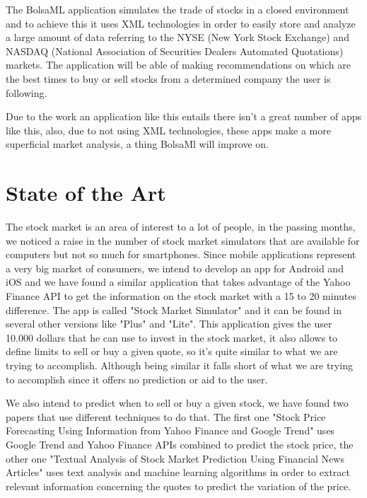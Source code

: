 \documentclass[twocolumn,twoside,11pt,a4paper]{article}
\begin{document}
The BolsaML application simulates the trade of stocks in a closed environment
and to achieve this it uses XML technologies in order to easily store and
analyze a large amount of data referring to the NYSE (New York Stock Exchange) and NASDAQ (National Association of Securities Dealers Automated Quotations) markets.
The application will be able of making recommendations on which are the best
times to buy or sell stocks from a determined company the user is following.

Due to the work an application like this entails there isn't a great number
of apps like this, also, due to not using XML technologies, these apps 
make a more superficial market analysis, a thing BolsaMl will improve on. 

\section{State of the Art}\label{sec:sota}

The stock market is an area of interest to a lot of people, in the passing months, we noticed a raise in the number of stock market simulators that are available for computers but not so much for smartphones. Since mobile applications represent a very big market of consumers, we intend to develop an app for Android and iOS and we have found a similar application that takes advantage of the Yahoo Finance API to get the information on the stock market with a 15 to 20 minutes difference. The app is called "Stock Market Simulator" \cite{kn:stockmarketsimapp} and it can be found in several other versions like "Plus" and "Lite". This application gives the user 10.000 dollars that he can use to invest in the stock market, it also allows to define limits to sell or buy a given quote, so it's quite similar to what we are trying to accomplish. Although being similar it falls short of what we are trying to accomplish since it offers no prediction or aid to the user. 

We also intend to predict when to sell or buy a given stock, we have found two papers that use different techniques to do that. The first one "Stock	Price	Forecasting	Using	Information	from	Yahoo	Finance	and Google	Trend" \cite{kn:paperforecastingyahoogoogle} uses Google Trend and Yahoo Finance APIs combined to predict the stock price, the other one "Textual Analysis of Stock Market Prediction Using Financial News Articles" \cite{kn:papertextanalysisprediction} uses text analysis and machine learning algorithms in order to extract relevant information concerning the quotes to predict the variation of the price.
\end{document}
